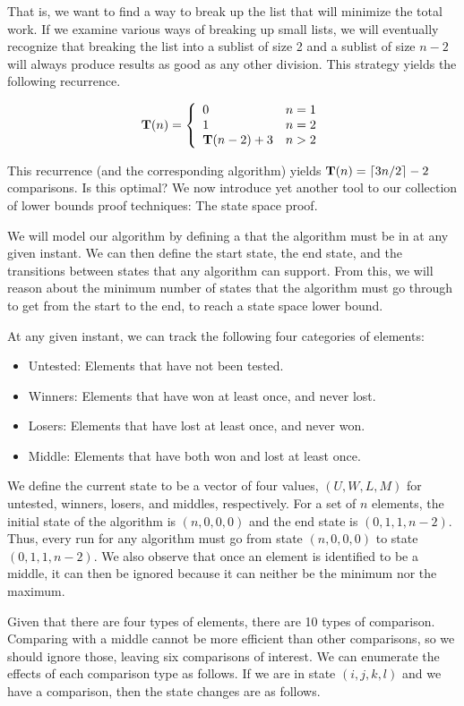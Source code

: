 That is, we want to find a way to break up the list that will minimize
the total work.
If we examine various ways of breaking up small lists, we will
eventually recognize that breaking the list into a sublist of size 2
and a sublist of size \(n-2\) will always produce results as good as
any other division.
This strategy yields the following recurrence.

\[\mbox{$\textbf{T}(n)$} = \left\{
\begin{array}{ll}
0&n=1\\
1&n=2\\
{\bf T}(n-2) + 3&n>2
\end{array}\right. \]

This recurrence (and the corresponding algorithm) yields
\(\mbox{$\textbf{T}(n)$} = \lceil 3n/2 \rceil - 2\) comparisons.
Is this optimal?
We now introduce yet another tool to our collection of lower bounds
proof techniques: The state space proof. 

We will model our algorithm by defining a  that the
algorithm must be in at any given instant.
We can then define the start state, the end state, and the
transitions between states that any algorithm can support.
From this, we will reason about the minimum number of states that the
algorithm must go through to get from the start to the end, to reach
a state space lower bound.

At any given instant, we can track the following four categories of
elements:
\begin{itemize}
\item Untested: Elements that have not been tested.
\item Winners: Elements that have won at least once, and never lost.
\item Losers: Elements that have lost at least once, and never won.
\item Middle: Elements that have both won and lost at least once.
\end{itemize}

We define the current state to be a vector of four values,
\((U, W, L, M)\) for untested, winners, losers, and middles,
respectively.
For a set of \(n\) elements, the initial state of the algorithm is
\((n, 0, 0, 0)\) and the end state is \((0, 1, 1, n-2)\).
Thus, every run for any algorithm must go from
state \((n, 0, 0, 0)\) to state \((0, 1, 1, n-2)\).
We also observe that once an element is identified to be a middle,
it can then be ignored because it can neither be the minimum nor the
maximum.

Given that there are four types of elements, there are 10 types of
comparison.
Comparing with a middle cannot be more efficient than other
comparisons, so we should ignore those, leaving six comparisons of
interest.
We can enumerate the effects of each comparison type as follows.
If we are in state \((i, j, k, l)\) and we have a comparison, then the
state changes are as follows.

